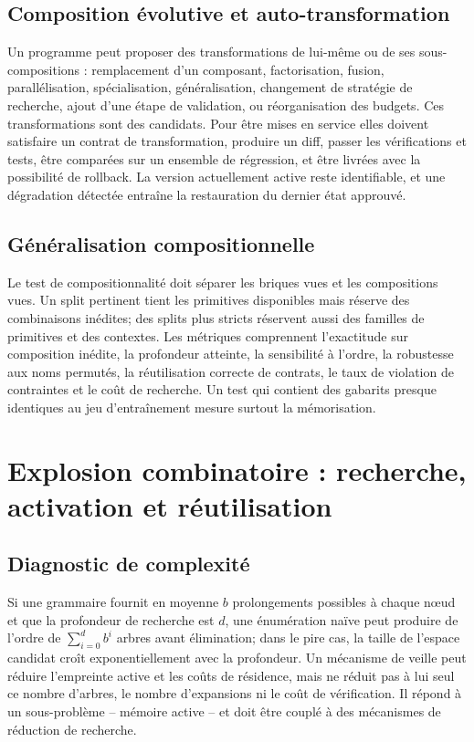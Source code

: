 \documentclass[11pt,a4paper]{article}
\theoremstyle{definition}
\theoremstyle{plain}
\theoremstyle{remark}
\begin{document}
\subsection{Composition évolutive et auto-transformation}
Un programme peut proposer des transformations de lui-même ou de ses sous-compositions : remplacement d'un composant, factorisation, fusion, parallélisation, spécialisation, généralisation, changement de stratégie de recherche, ajout d'une étape de validation, ou réorganisation des budgets. Ces transformations sont des candidats. Pour être mises en service elles doivent satisfaire un contrat de transformation, produire un diff, passer les vérifications et tests, être comparées sur un ensemble de régression, et être livrées avec la possibilité de rollback. La version actuellement active reste identifiable, et une dégradation détectée entraîne la restauration du dernier état approuvé.

\subsection{Généralisation compositionnelle}
Le test de compositionnalité doit séparer les briques vues et les compositions vues. Un split pertinent tient les primitives disponibles mais réserve des combinaisons inédites; des splits plus stricts réservent aussi des familles de primitives et des contextes. Les métriques comprennent l'exactitude sur composition inédite, la profondeur atteinte, la sensibilité à l'ordre, la robustesse aux noms permutés, la réutilisation correcte de contrats, le taux de violation de contraintes et le coût de recherche. Un test qui contient des gabarits presque identiques au jeu d'entraînement mesure surtout la mémorisation.

\section{Explosion combinatoire : recherche, activation et réutilisation}
\subsection{Diagnostic de complexité}
Si une grammaire fournit en moyenne \(b\) prolongements possibles à chaque nœud et que la profondeur de recherche est \(d\), une énumération naïve peut produire de l'ordre de \(\sum_{i=0}^{d}b^i\) arbres avant élimination; dans le pire cas, la taille de l'espace candidat croît exponentiellement avec la profondeur. Un mécanisme de veille peut réduire l'empreinte active et les coûts de résidence, mais ne réduit pas à lui seul ce nombre d'arbres, le nombre d'expansions ni le coût de vérification. Il répond à un sous-problème -- mémoire active -- et doit être couplé à des mécanismes de réduction de recherche.
\end{document}
